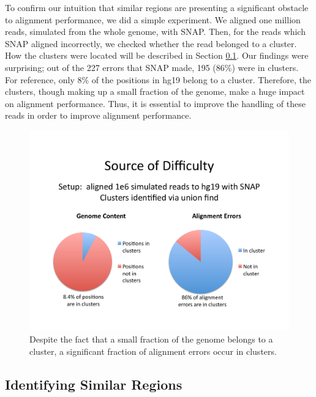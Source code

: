 \documentclass[twocolumn,10pt]{article}
\begin{document}
To confirm our intuition that similar regions are presenting a significant obstacle to alignment performance, we did a simple experiment.  We aligned one million reads, simulated from the whole genome, with SNAP.  Then, for the reads which SNAP aligned incorrectly, we checked whether the read belonged to a cluster.  How the clusters were located will be described in Section \ref{section:identifyingSimilarRegions}.  Our findings were surprising; out of the 227 errors that SNAP made, 195 (86\%) were in clusters.  For reference, only 8\% of the positions in hg19 belong to a cluster.  Therefore, the clusters, though making up a small fraction of the genome, make a huge impact on alignment performance.  Thus, it is essential to improve the handling of these reads in order to improve alignment performance.

\begin{figure}
\centering
\includegraphics[scale=0.6]{errorsInClusters.pdf}
\caption{Despite the fact that a small fraction of the genome belongs to a cluster, a significant fraction of alignment errors occur in clusters.}
\label{fig:errorsInClusters}
\end{figure}

\subsection{Identifying Similar Regions}
\label{section:identifyingSimilarRegions}
\end{document}
